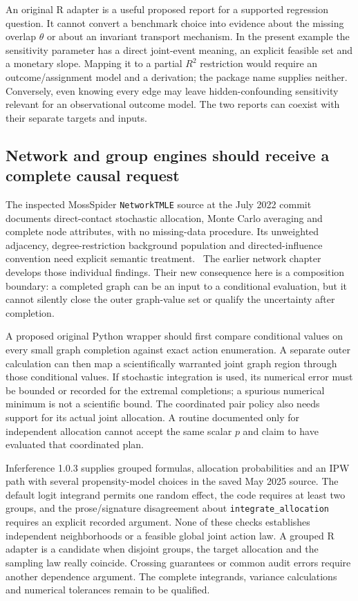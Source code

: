 An original R adapter is a useful proposed report for a supported regression
question. It cannot convert a benchmark choice into evidence about the
missing overlap $\theta$ or about an invariant transport mechanism. In the
present example the sensitivity parameter has a direct joint-event meaning,
an explicit feasible set and a monetary slope. Mapping it to a partial
$R^2$ restriction would require an outcome/assignment model and a derivation;
the package name supplies neither. Conversely, even knowing every edge may
leave hidden-confounding sensitivity relevant for an observational outcome
model. The two reports can coexist with their separate targets and inputs.

\subsection{Network and group engines should receive a complete causal request}

The inspected MossSpider \texttt{NetworkTMLE} source at the July 2022 commit
documents direct-contact stochastic allocation, Monte Carlo averaging and
complete node attributes, with no missing-data procedure. Its unweighted
adjacency, degree-restriction background population and directed-influence
convention need explicit semantic treatment.~\citep{v13_sw_mossspider}
The earlier network chapter develops those individual findings. Their new
consequence here is a composition boundary: a completed graph can be an
input to a conditional evaluation, but it cannot silently close the outer
graph-value set or qualify the uncertainty after completion.

A proposed original Python wrapper should first compare conditional values
on every small graph completion against exact action enumeration. A separate
outer calculation can then map a scientifically warranted joint graph region
through those conditional values. If stochastic integration is used, its
numerical error must be bounded or recorded for the extremal completions;
a spurious numerical minimum is not a scientific bound. The coordinated
pair policy also needs support for its actual joint allocation. A routine
documented only for independent allocation cannot accept the same scalar
$p$ and claim to have evaluated that coordinated plan.

Inferference 1.0.3 supplies grouped formulas, allocation probabilities and an
IPW path with several propensity-model choices in the saved May 2025 source.
The default logit integrand permits one random effect, the code requires at
least two groups, and the prose/signature disagreement about
\texttt{integrate\_allocation} requires an explicit recorded argument.
\citep{v13_sw_inferference} None of these checks establishes independent
neighborhoods or a feasible global joint action law. A grouped R adapter is
a candidate when disjoint groups, the target allocation and the sampling law
really coincide. Crossing guarantees or common audit errors require another
dependence argument. The complete integrands, variance calculations and
numerical tolerances remain to be qualified.

